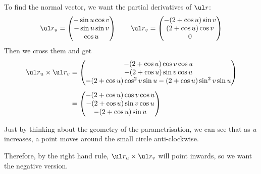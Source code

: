 \documentclass[a4paper]{article}
\begin{document}
To find the normal vector, we want the partial derivatives of $\ul r$: $$
\ul r_u = \begin{pmatrix} -\sin u \cos v \\ -\sin u \sin v \\ \cos u \end{pmatrix} \qquad
\ul r_v = \begin{pmatrix} -(2 + \cos u) \sin v \\ (2 + \cos u) \cos v \\ 0 \end{pmatrix}
$$
Then we cross them and get \begin{align*}
\ul r_u \times \ul r_v &= \begin{pmatrix} -(2 + \cos u) \cos v \cos u \\ -(2 + \cos u) \sin v \cos u \\ -(2 + \cos u) \cos^2 v \sin u - (2 + \cos u) \sin^2 v \sin u \end{pmatrix}\\[1ex]
&= \begin{pmatrix} -(2 + \cos u) \cos v \cos u \\ -(2 + \cos u) \sin v \cos u \\ -(2 + \cos u) \sin u \end{pmatrix}
\end{align*}

Just by thinking about the geometry of the parametrisation, we can see that as $u$ increases, a point moves around the small circle anti-clockwise.

Therefore, by the right hand rule, $\ul r_u \times \ul r_v$ will point inwards, so we want the negative version.
\end{document}
